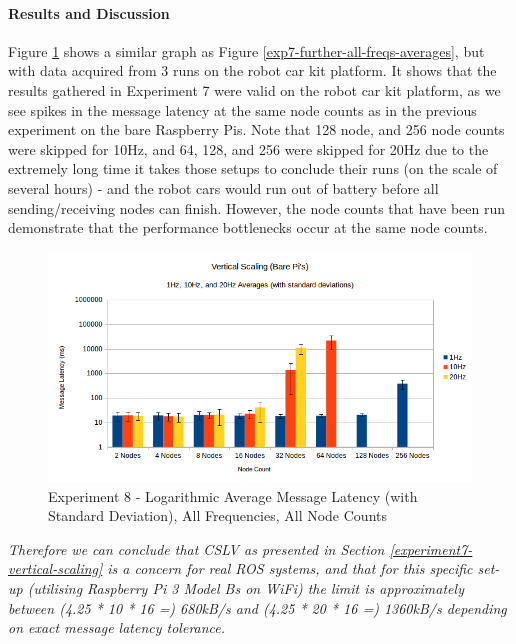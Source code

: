 \documentclass[../dissertation.tex]{subfiles}
\begin{document}
\paragraph{Results and Discussion} Figure \ref{exp8-all-freqs-averages} shows a similar graph as Figure \ref{exp7-further-all-freqs-averages}, but with data acquired from 3 runs on the robot car kit platform. It shows that the results gathered in Experiment 7 were valid on the robot car kit platform, as we see spikes in the message latency at the same node counts as in the previous experiment on the bare Raspberry Pis. Note that 128 node, and 256 node counts were skipped for 10Hz, and 64, 128, and 256 were skipped for 20Hz due to the extremely long time it takes those setups to conclude their runs (on the scale of several hours) - and the robot cars would run out of battery before all sending/receiving nodes can finish. However, the node counts that have been run demonstrate that the performance bottlenecks occur at the same node counts.

\begin{figure}[H]
\centering
\includegraphics[width=\textwidth]{images/experiment9/vertical_scaling_all_freqs_log_avg_msg_latency.png}
\caption{Experiment 8 - Logarithmic Average Message Latency (with Standard Deviation), All Frequencies, All Node Counts}
\label{exp8-all-freqs-averages}
\end{figure}

\textit{Therefore we can conclude that CSLV as presented in Section \ref{experiment7-vertical-scaling} is a concern for real ROS systems, and that for this specific set-up (utilising Raspberry Pi 3 Model Bs on WiFi) the limit is approximately between (4.25 * 10 * 16 =) 680kB/s and (4.25 * 20 * 16 =) 1360kB/s depending on exact message latency tolerance.}
\end{document}
